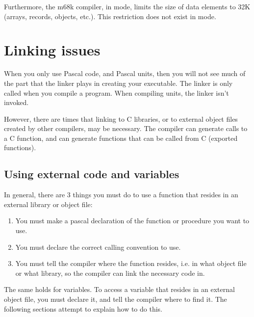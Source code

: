 Furthermore, the m68k compiler, in  mode, limits the
size of data elements to 32K (arrays, records, objects, etc.). 
This restriction does not exist in  mode.


%
%
%

\chapter{Linking issues}
\label{ch:Linking}
When you only use Pascal code, and Pascal units, then you will not see much
of the part that the linker plays in creating your executable.
The linker is only called when you compile a program. When compiling units,
the linker isn't invoked.

However, there are times that linking to C libraries, or to external
object files created by other compilers, may be necessary. The \fpc compiler
can generate calls to a C function, and can generate functions that can
be called from C (exported functions).


\section{Using external code and variables}

In general, there are 3 things you must do to use a function that resides in
an external library or object file:
\begin{enumerate}
\item You must make a pascal declaration of the function or procedure you
want to use.
\item You must declare the correct calling convention to use.
\item You must tell the compiler where the function resides, i.e. in what
object file or what library, so the compiler can link the necessary code in.
\end{enumerate}
The same holds for variables. To access a variable that resides in an
external object file, you must declare it, and tell the compiler where to
find it.
The following sections attempt to explain how to do this.



